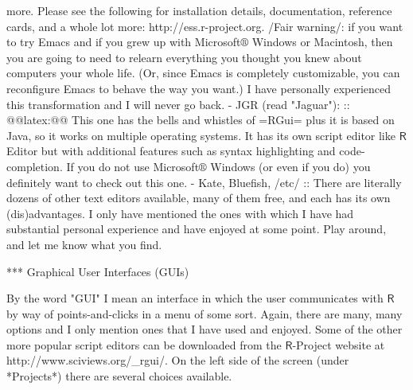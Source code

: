                 more. Please see the following for installation
                details, documentation, reference cards, and a whole
                lot more: http://ess.r-project.org.  /Fair warning/:
                if you want to try Emacs and if you grew up with
                Microsoft\(\circledR\) Windows or Macintosh, then you
                are going to need to relearn everything you thought
                you knew about computers your whole life. (Or, since
                Emacs is completely customizable, you can reconfigure
                Emacs to behave the way you want.) I have personally
                experienced this transformation and I will never go
                back.
- JGR (read "Jaguar"): :: @@latex:@@ This one has the bells
     and whistles of =RGui= plus it is based on Java, so it works on
     multiple operating systems. It has its own script editor like
     \(\mathsf{R}\) Editor but with additional features such as syntax
     highlighting and code-completion. If you do not use
     Microsoft\(\circledR\) Windows (or even if you do) you definitely
     want to check out this one.
- Kate, Bluefish, /etc/ :: There are literally dozens of other text
     editors available, many of them free, and each has its own
     (dis)advantages. I only have mentioned the ones with which I have
     had substantial personal experience and have enjoyed at some
     point. Play around, and let me know what you find.

*** Graphical User Interfaces (GUIs)

By the word "GUI" I mean an interface in which the user communicates
with \(\mathsf{R}\) by way of points-and-clicks in a menu of some
sort. Again, there are many, many options and I only mention ones that
I have used and enjoyed. Some of the other more popular script editors
can be downloaded from the \(\mathsf{R}\)-Project website at
http://www.sciviews.org/_rgui/. On the left side of the screen
(under *Projects*) there are several choices available.


